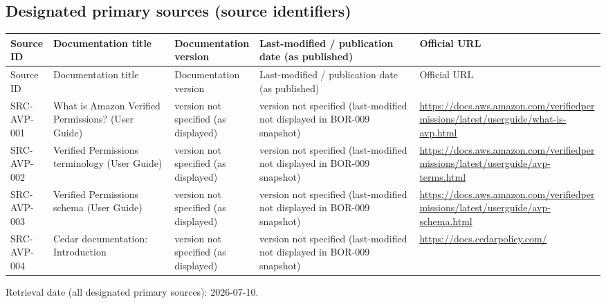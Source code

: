 \documentclass{article}
\begin{document}
\subsection*{Designated primary sources (source identifiers)}
\begin{longtable}{@{}p{}p{}p{}p{}p{}@{}}
\toprule
Source ID & Documentation title & Documentation version & Last-modified / publication date (as published) & Official URL\\
\midrule
\endfirsthead
\toprule
Source ID & Documentation title & Documentation version & Last-modified / publication date (as published) & Official URL\\
\midrule
\endhead
SRC-AVP-001 & What is Amazon Verified Permissions? (User Guide) & version not specified (as displayed) & version not specified (last-modified not displayed in BOR-009 snapshot) & \url{https://docs.aws.amazon.com/verifiedpermissions/latest/userguide/what-is-avp.html}\\
SRC-AVP-002 & Verified Permissions terminology (User Guide) & version not specified (as displayed) & version not specified (last-modified not displayed in BOR-009 snapshot) & \url{https://docs.aws.amazon.com/verifiedpermissions/latest/userguide/avp-terms.html}\\
SRC-AVP-003 & Verified Permissions schema (User Guide) & version not specified (as displayed) & version not specified (last-modified not displayed in BOR-009 snapshot) & \url{https://docs.aws.amazon.com/verifiedpermissions/latest/userguide/avp-schema.html}\\
SRC-AVP-004 & Cedar documentation: Introduction & version not specified (as displayed) & version not specified (last-modified not displayed in BOR-009 snapshot) & \url{https://docs.cedarpolicy.com/}\\
\bottomrule
\end{longtable}
Retrieval date (all designated primary sources): 2026-07-10.
\end{document}
